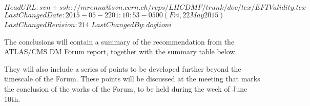 \svnidlong
{$HeadURL: svn+ssh://mrenna@svn.cern.ch/reps/LHCDMF/trunk/doc/tex/EFTValidity.tex $}
{$LastChangedDate: 2015-05-22 01:10:53 -0500 (Fri, 22 May 2015) $}
{$LastChangedRevision: 214 $}
{$LastChangedBy: doglioni $}

%
%
%
%
%

The conclusions will contain a summary of the recommendation from the ATLAS/CMS DM Forum report, 
together with the summary table below. 



They will also include a series of points to be developed further beyond the timescale of the Forum. These points will be 
discussed at the meeting that marks the conclusion of the works of the Forum, to be held during the week of June 10th. 

